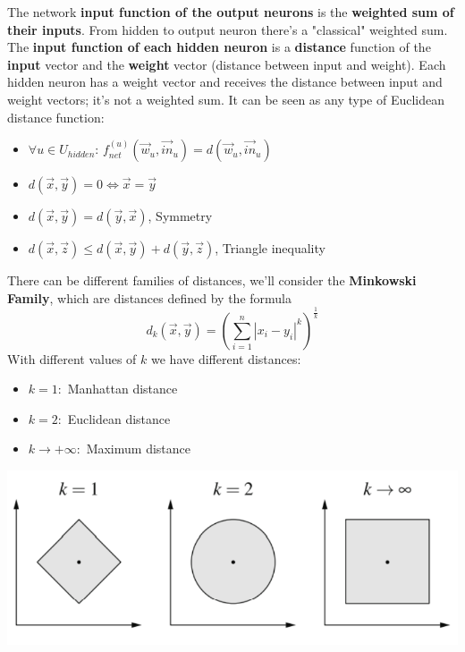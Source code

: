 \documentclass[11pt]{article}
\begin{document}
		The network \textbf{input function of the output neurons} is the \textbf{weighted sum of their inputs}. From hidden to output neuron there's a "classical" weighted sum.\\
		
		The \textbf{input function of each hidden neuron} is a \textbf{distance} function of the \textbf{input} vector and the \textbf{weight} vector (distance between input and weight). Each hidden neuron has a weight vector and receives the distance between input and weight vectors; it's not a weighted sum. It can be seen as any type of Euclidean distance function: 
		\begin{itemize}
			\item $\forall u \in U_{hidden}: \, f_{net}^{(u)} \left(\vec{w}_u, \vec{in}_u \right) = d \left(\vec{w}_u, \vec{in}_u \right)$
			\item $d \left(\vec{x}, \vec{y}\right) = 0 \Leftrightarrow \vec{x} = \vec{y}$
			\item $d \left(\vec{x}, \vec{y}\right) = d \left(\vec{y}, \vec{x}\right)$, Symmetry
			\item $d \left(\vec{x}, \vec{z}\right) \leq d \left(\vec{x}, \vec{y}\right) + d \left(\vec{y}, \vec{z}\right)$, Triangle inequality
		\end{itemize}
		
		There can be different families of distances, we'll consider the \textbf{Minkowski Family}, which are distances defined by the formula
		$$ d_k \left(\vec{x}, \vec{y}\right) = \left(\sum_{i=1}^n |x_i - y_i|^k \right)^{\frac{1}{k}} $$
		With different values of $k$ we have different distances: 
		\begin{itemize}
			\item $k = 1:$ Manhattan distance
			\item $k = 2:$ Euclidean distance
			\item $k \rightarrow + \infty:$ Maximum distance
		\end{itemize}
		
		\newpage
		
		\begin{center}
			\includegraphics[width=0.7\columnwidth]{img/NN/distances}
		\end{center}
		
\end{document}
